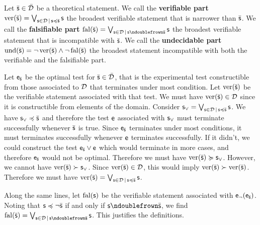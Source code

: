 \documentclass[11pt,letterpaper,fleqn]{memoir} %
\begin{document}
\begin{mathSection}
\begin{defn}
	Let $\bar{\mathsf{s}} \in \bar{\mathcal{D}}$ be a theoretical statement. We call the \textbf{verifiable part} $\operatorname{ver}(\bar{\mathsf{s}}) = \bigvee_{\mathsf{s} \in \mathcal{D} \, | \, \mathsf{s} \preccurlyeq \bar{\mathsf{s}}} \mathsf{s}$ the broadest verifiable statement that is narrower than $\bar{\mathsf{s}}$. We call the \textbf{falsifiable part} $\fal(\bar{\stmt}) = \bigOR_{\stmt \in \edomain \, | \, \stmt \ncomp \bar{\stmt}} \stmt$ the broadest verifiable statement that is incompatible with $\bar{\mathsf{s}}$. We call the \textbf{undecidable part} $\operatorname{und}(\bar{\mathsf{s}}) = \neg \operatorname{ver}(\bar{\mathsf{s}}) \wedge \neg \operatorname{fal}(\bar{\mathsf{s}})$ the broadest statement incompatible with both the verifiable and the falsifiable part.
\end{defn}
\begin{justification}
	Let $\mathsf{e}_{\bar{\mathsf{s}}}$ be the optimal test for $\bar{\mathsf{s}} \in \bar{\mathcal{D}}$, that is the experimental test constructible from those associated to $\mathcal{D}$ that terminates under most condition. Let $\operatorname{ver}(\bar{\mathsf{s}})$ be the verifiable statement associated with that test. We must have $\operatorname{ver}(\bar{\mathsf{s}}) \in \mathcal{D}$ since it is constructible from elements of the domain. Consider $\mathsf{s}_{\vee} = \bigvee_{\mathsf{s} \in \mathcal{D} \, | \, \mathsf{s} \preccurlyeq \bar{\mathsf{s}}} \mathsf{s}$. We have $\mathsf{s}_{\vee} \preccurlyeq \bar{\mathsf{s}}$ and therefore the test $\mathsf{e}$ associated with $\mathsf{s}_{\vee}$ must terminate successfully whenever $\bar{\mathsf{s}}$ is true. Since $\mathsf{e}_{\bar{\mathsf{s}}}$ terminates under most conditions, it must terminates successfully whenever $\mathsf{e}$ terminates successfully. If it didn't, we could construct the test $\mathsf{e}_{\bar{\mathsf{s}}} \vee \mathsf{e}$ which would terminate in more cases, and therefore $\mathsf{e}_{\bar{\mathsf{s}}}$ would not be optimal. Therefore we must have $\operatorname{ver}(\bar{\mathsf{s}}) \succcurlyeq \mathsf{s}_{\vee}$.  However, we cannot have $\operatorname{ver}(\bar{\mathsf{s}}) \succ \mathsf{s}_{\vee}$. Since $\operatorname{ver}(\bar{\mathsf{s}}) \in \mathcal{D}$, this would imply $\operatorname{ver}(\bar{\mathsf{s}}) \succ \operatorname{ver}(\bar{\mathsf{s}})$. Therefore we must have $\operatorname{ver}(\bar{\mathsf{s}}) = \bigvee_{\mathsf{s} \in \mathcal{D} \, | \, \mathsf{s} \preccurlyeq \bar{\mathsf{s}}} \mathsf{s}$.
	
	Along the same lines, let $\operatorname{fal}(\mathsf{s})$ be the verifiable statement associated with $\mathsf{e}_\neg(\mathsf{e}_{\bar{\mathsf{s}}})$. Noting that $\mathsf{s} \preccurlyeq \neg \bar{\mathsf{s}}$ if and only if $\stmt \ncomp \tstmt$, we find $\fal(\bar{\stmt}) = \bigOR_{\stmt \in \edomain \, | \, \stmt \ncomp \tstmt} \stmt$. This justifies the definitions.
\end{justification}




\end{mathSection}
\end{document}
